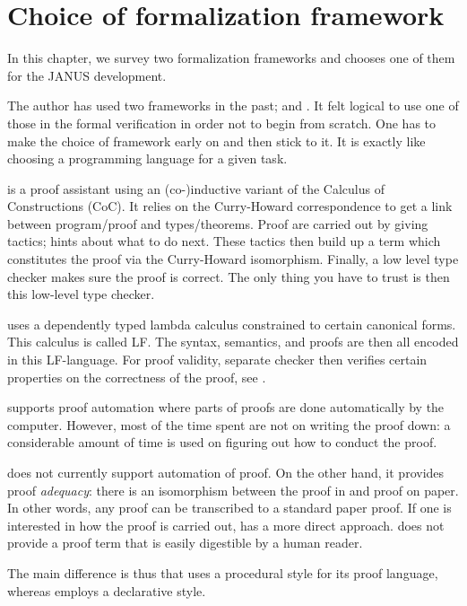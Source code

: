 \chapter{Choice of formalization framework}
\label{chap:thm-prover-choice}

In this chapter, we survey two formalization frameworks and chooses
one of them for the JANUS development.

The author has used two frameworks in the past; \coq{} and
\twelf{}. It felt logical to use one of those in the formal
verification in order not to begin from scratch.  One has to make the
choice of framework early on and then stick to it. It is exactly like
choosing a programming language for a given task.

\coq{} is a proof assistant using an (co-)inductive variant of the
Calculus of Constructions (CoC). It relies on the Curry-Howard
correspondence to get a link between program/proof and
types/theorems. Proof are carried out by giving tactics; hints about
what to do next. These tactics then build up a term which constitutes
the proof via the Curry-Howard isomorphism. Finally, a low level type
checker makes sure the proof is correct. The only thing you have to
trust is then this low-level type checker.

\twelf{} uses a dependently typed lambda calculus constrained to
certain canonical forms. This calculus is called LF. The syntax,
semantics, and proofs are then all encoded in this LF-language. For
proof validity, separate checker then verifies certain properties on
the correctness of the proof, see \cite{harper.crary:how,
  harper.licata:mechanizing, harper.honsell.ea:framework}.

\coq{} supports proof automation where parts of proofs are done
automatically by the computer. However, most of the time spent are not
on writing the proof down: a considerable amount of time is used on
figuring out how to conduct the proof.

\twelf{} does not currently support automation of proof. On the other
hand, it provides proof \emph{adequacy}: there is an isomorphism
between the proof in \twelf{} and proof on paper. In other words, any
proof can be transcribed to a standard paper proof. If one is
interested in how the proof is carried out, \twelf{} has a more direct
approach. \coq{} does not provide a proof term that is easily
digestible by a human reader.

The main difference is thus that \coq{} uses a procedural style for
its proof language, whereas \twelf{} employs a declarative style.

